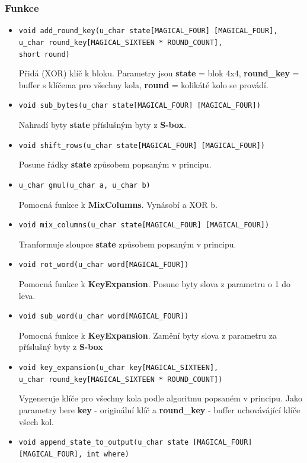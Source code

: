 \documentclass[12pt]{article}
\begin{document}
\subsubsection{Funkce}
\begin{itemize}
	\item \texttt{void add\_round\_key(u\_char state[MAGICAL\_FOUR]
		[MAGICAL\_FOUR],\\
		u\_char round\_key[MAGICAL\_SIXTEEN * ROUND\_COUNT],\\
		short round)}

		Přidá (XOR) klíč k bloku. Parametry jsou
			\textbf{state} = blok 4x4, \textbf{round\_key} = 
			buffer s klíčema pro všechny kola, \textbf{round} =
			kolikáté kolo se provádí.
	\item \texttt{void sub\_bytes(u\_char state[MAGICAL\_FOUR]
		[MAGICAL\_FOUR])}

		Nahradí byty \textbf{state} příslušným byty z \textbf{S-box}.
	\item \texttt{void shift\_rows(u\_char state[MAGICAL\_FOUR]
		[MAGICAL\_FOUR])}

		Posune řádky \textbf{state} způsobem popsaným v principu.
	\item \texttt{u\_char gmul(u\_char a, u\_char b)}

		Pomocná funkce k \textbf{MixColumns}. Vynásobí a XOR b.
	\item \texttt{void mix\_columns(u\_char state[MAGICAL\_FOUR]
		[MAGICAL\_FOUR])}

		Tranformuje sloupce \textbf{state} způsobem popsaným v principu.
	\item \texttt{void rot\_word(u\_char word[MAGICAL\_FOUR])}
	
		Pomocná funkce k \textbf{KeyExpansion}. Posune byty slova z
		parametru o 1 do leva.
	\item \texttt{void sub\_word(u\_char word[MAGICAL\_FOUR])}

		Pomocná funkce k \textbf{KeyExpansion}. Zamění byty slova z
		parametru za příslušný byty z \textbf{S-box}
	\item \texttt{void key\_expansion(u\_char key[MAGICAL\_SIXTEEN],\\
		u\_char round\_key[MAGICAL\_SIXTEEN * ROUND\_COUNT])}

		Vygeneruje klíče pro všechny kola podle algoritmu popsaném
		v principu. Jako parametry bere \textbf{key} - originální
		klíč a \textbf{round\_key} - buffer uchovávájící klíče 
		všech kol.
	\item \texttt{void append\_state\_to\_output(u\_char state
		[MAGICAL\_FOUR][MAGICAL\_FOUR], int where)}


\end{itemize}
\end{document}
